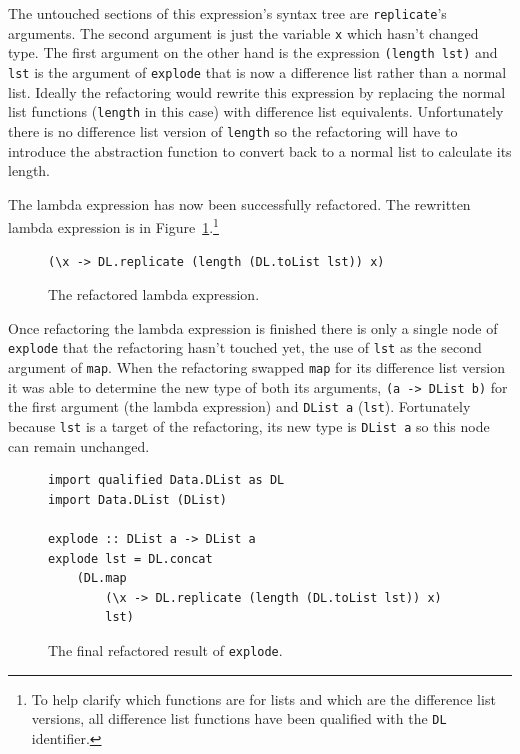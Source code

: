 The untouched sections of this expression's syntax tree are \texttt{replicate}'s arguments. The second argument is just the variable \texttt{x} which hasn't changed type. The first argument on the other hand is the expression \texttt{(length lst)} and \texttt{lst} is the argument of \texttt{explode} that is now a difference list rather than a normal list. Ideally the refactoring would rewrite this expression by replacing the normal list functions (\texttt{length} in this case) with difference list equivalents. Unfortunately there is no difference list version of \texttt{length} so the refactoring will have to introduce the abstraction function to convert back to a normal list to calculate its length. 

The lambda expression has now been successfully refactored. The rewritten lambda expression is in Figure~\ref{lamRef}.\footnote{To help clarify which functions are for lists and which are the difference list versions, all difference list functions have been qualified with the \texttt{DL} identifier.}

\begin{figure}[t]
\begin{lstlisting}
(\x -> DL.replicate (length (DL.toList lst)) x)
\end{lstlisting}
\caption{The refactored lambda expression.}
\label{lamRef}
\end{figure}


Once refactoring the lambda expression is finished there is only a single node of \texttt{explode} that the refactoring hasn't touched yet, the use of \texttt{lst} as the second argument of \texttt{map}. When the refactoring swapped \texttt{map} for its difference list version it was able to determine the new type of both its arguments, \texttt{(a -> DList b)} for the first argument (the lambda expression) and \texttt{DList a} (\texttt{lst}). Fortunately because \texttt{lst} is a target of the refactoring, its new type is \texttt{DList a} so this node can remain unchanged.

\begin{figure}[t]
\begin{lstlisting}
import qualified Data.DList as DL
import Data.DList (DList)

explode :: DList a -> DList a
explode lst = DL.concat 
	(DL.map 
		(\x -> DL.replicate (length (DL.toList lst)) x) 
		lst)
\end{lstlisting} 
\caption{The final refactored result of \texttt{explode}.}
\label{explodeFinal}
\end{figure}

